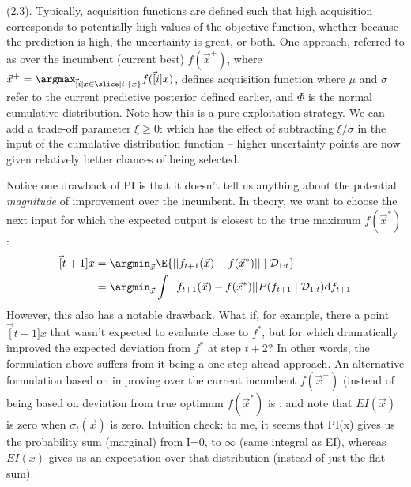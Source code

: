 \documentclass[11pt]{article}
\begin{document}
 (2.3). Typically, acquisition functions are defined such that high acquisition corresponds to potentially high values of the objective function, whether because the prediction is high, the uncertainty is great, or both. One approach, referred to as  over the incumbent (current best) $f(\vec{x}^+)$, where $\vec{x}^+ = \argmax_{\vec[i]{x} \in \slice[t]{x}} f(\vec[i]{x})$, defines acquisition function
where $\mu$ and $\sigma$ refer to the current predictive posterior defined earlier, and $\Phi$ is the normal cumulative distribution. Note how this is a pure exploitation strategy. We can add a trade-off parameter $\xi \ge 0$: 
which has the effect of subtracting $\xi/\sigma$ in the input of the cumulative distribution function -- higher uncertainty points are now given relatively better chances of being selected. 

Notice one drawback of PI is that it doesn't tell us anything about the potential \textit{magnitude} of improvement over the incumbent. In theory, we want to choose the next input for which the expected output is closest to the true maximum $f(\vec{x}^*)$:
\begin{align}
	\vec[t+1]{x}
		&= \argmin_{\vec x} \E{ ||  f_{t+1}(\vec x) - f(\vec{x}^*)  || \mid \mathcal{D}_{1:t} } \\ 
		&= \argmin_{\vec x} \int ||  f_{t+1}(\vec x) - f(\vec{x}^*)  || P(f_{t+1} \mid \mathcal{D}_{1:t}) \mathrm{d}f_{t+1}
\end{align}
However, this also has a notable drawback. What if, for example, there a point $\vec[t+1]{x}$ that wasn't expected to evaluate close to $f^*$, but for which dramatically improved the expected deviation from $f^*$ at step $t+2$? In other words, the formulation above suffers from it being a one-step-ahead approach. An alternative formulation based on improving over the current incumbent $f(\vec{x}^+)$ (instead of being based on deviation from true optimum $f(\vec{x}^*)$ is :
and note that $EI(\vec x)$ is zero when $\sigma_t(\vec x)$ is zero.  Intuition check: to me, it seems that PI(x) gives us the probability sum (marginal) from I=0, to $\infty$ (same integral as EI), whereas $EI(x)$ gives us an expectation over that distribution (instead of just the flat sum). 
\end{document}
